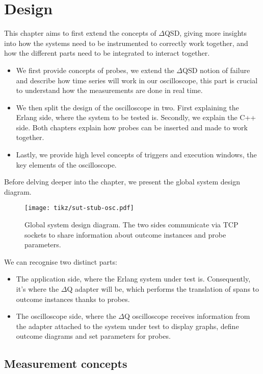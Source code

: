 \chapter{Design}
    This chapter aims to first extend the concepts of $\Delta$QSD, giving more insights into how the systems need to be instrumented to correctly work together, and how the different parts need to be integrated to interact together.
    \begin{itemize}
        \item We first provide concepts of probes, we extend the $\Delta$QSD notion of failure and describe how time series will work in our oscilloscope, this part is crucial to understand how the measurements are done in real time.
        \item We then split the design of the oscilloscope in two. First explaining the Erlang side, where the system to be tested is. Secondly, we explain the C++ side. Both chapters explain how probes can be inserted and made to work together.
        \item Lastly, we provide high level concepts of triggers and execution windows, the key elements of the oscilloscope. 
    \end{itemize}

    Before delving deeper into the chapter, we present the global system design diagram.

    \begin{figure}[H]
        \begin{center}
            \texttt{[image: tikz/sut-stub-osc.pdf]}
        \end{center}
        \caption{Global system design diagram. The two sides communicate via TCP sockets to share information about outcome instances and probe parameters.}
    \end{figure}

    We can recognise two distinct parts:
    \begin{itemize}
        \item The application side, where the Erlang system under test is. Consequently, it's where the $\Delta$Q adapter will be, which performs the translation of spans to outcome instances thanks to probes.
        \item The oscilloscope side, where the $\Delta$Q oscilloscope receives information from the adapter attached to the system under test to display graphs, define outcome diagrams and set parameters for probes.
    \end{itemize}


    \section{Measurement concepts}
    
    
    
      
    
    
    
    
